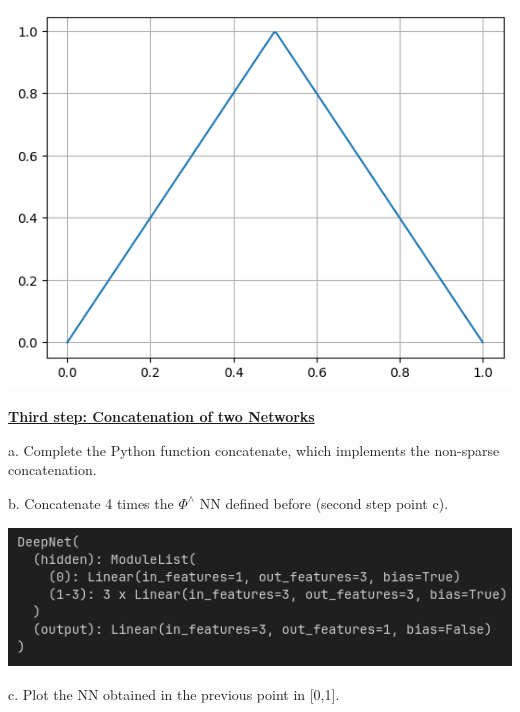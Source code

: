 \documentclass{article}
\newcommand{\step}[1]{\underline{\textbf{\large{#1}}} }
\begin{document}
    \begin{center}\includegraphics[scale = 0.5]{phi_wedge.png}\end{center}

  \begin{center}\step{Third step: Concatenation of two Networks}\end{center}
    
    a. Complete the Python function concatenate, which implements the non-sparse concatenation. 
    
    b. Concatenate 4 times the $\Phi^\wedge$ NN defined before (second step point c). 

    \begin{center}\includegraphics[scale = 0.5]{output_concatenate.png}\end{center}

    c. Plot the NN obtained in the previous point in [0,1].
    
\end{document}

